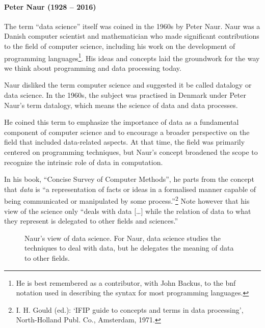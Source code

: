 
\paragraph{Peter Naur (1928 -- 2016)}

The term ``data science'' itself was coined in the 1960s by Peter Naur. Naur was
a Danish computer scientist and mathematician who made significant contributions to the
field of computer science, including his work on the development of programming
languages\footnote{He is best remembered as a contributor, with John Backus, to the
\gls{bnf} notation used in describing the syntax for most programming
languages.}.
His ideas and concepts laid the groundwork for the way we think about programming and data
processing today.

Naur disliked the term computer science and suggested it be called datalogy or data
science.  In the 1960s, the subject was practised in Denmark under Peter
Naur's term datalogy, which means the science of data and data processes.

He coined this term to emphasize the importance of data as a fundamental component of
computer science and to encourage a broader perspective on the field that included
data-related aspects. At that time, the field was primarily centered on programming
techniques, but Naur's concept broadened the scope to recognize the intrinsic role of data
in computation.

In his book, ``Concise Survey of Computer Methods'', he
parts from the concept that \emph{data} is ``a representation of facts or ideas in a
formalised manner capable of being communicated or manipulated by some
process.''\footnote{I. H. Gould (ed.): ‘IFIP guide to concepts and terms in data
processing’, North-Holland Publ. Co., Amsterdam, 1971.} Note however that his view of the
science only ``deals with data [\dots] while the relation of data to what they represent
is delegated to other fields and sciences.''

\begin{figure}
  \centering
  \caption{
    Naur's view of data science.
    For Naur, data science studies the techniques to deal
    with data, but he delegates the meaning of data to other fields.
  }
  \label{fig:naur}
\end{figure}

